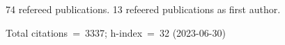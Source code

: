 74 refereed publications. 13 refeered publications as first author.

Total citations~=~3337; h-index~=~32 (2023-06-30)